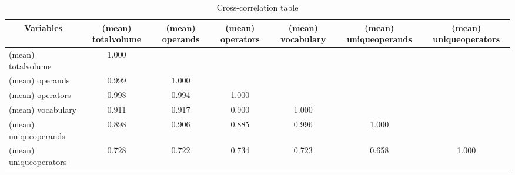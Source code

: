 \begin{table}[htbp]\centering \caption{Cross-correlation table\label{corrtable}}
\begin{tabular}{l  c  c  c  c  c  c }\hline\hline
\multicolumn{1}{c}{Variables} &(mean) totalvolume&(mean) operands&(mean) operators&(mean) vocabulary&(mean) uniqueoperands&(mean) uniqueoperators\\ \hline
(mean) totalvolume&1.000\\
(mean) operands&0.999&1.000\\
(mean) operators&0.998&0.994&1.000\\
(mean) vocabulary&0.911&0.917&0.900&1.000\\
(mean) uniqueoperands&0.898&0.906&0.885&0.996&1.000\\
(mean) uniqueoperators&0.728&0.722&0.734&0.723&0.658&1.000\\
\hline \hline 
 \end{tabular}
\end{table}
